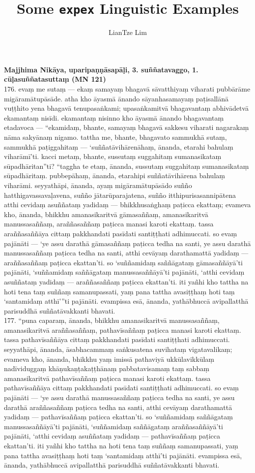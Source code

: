 \documentclass[11pt]{article}
\title{Some \texttt{expex} Linguistic Examples}
\author{LianTze Lim}
\begin{document}
\textbf{Majjhima Nikāya, uparipaṇṇāsapāḷi, 3. suññatavaggo, 1. cūḷasuññatasuttaṃ (MN 121)}\\[.3cm]

176. evaṃ me sutaṃ — ekaṃ samayaṃ bhagavā sāvatthiyaṃ viharati pubbārāme migāramātupāsāde. atha kho āyasmā ānando sāyanhasamayaṃ paṭisallānā vuṭṭhito yena bhagavā tenupasaṅkami; upasaṅkamitvā bhagavantaṃ abhivādetvā ekamantaṃ nisīdi. ekamantaṃ nisinno kho āyasmā ānando bhagavantaṃ etadavoca — “ekamidaṃ, bhante, samayaṃ bhagavā sakkesu viharati nagarakaṃ nāma sakyānaṃ nigamo. tattha me, bhante, bhagavato sammukhā sutaṃ, sammukhā paṭiggahitaṃ — ‘suññatāvihārenāhaṃ, ānanda, etarahi bahulaṃ viharāmī’ti. kacci metaṃ, bhante, sussutaṃ suggahitaṃ sumanasikataṃ sūpadhāritan”ti? “taggha te etaṃ, ānanda, sussutaṃ suggahitaṃ sumanasikataṃ sūpadhāritaṃ. pubbepāhaṃ, ānanda, etarahipi suññatāvihārena bahulaṃ viharāmi. seyyathāpi, ānanda, ayaṃ migāramātupāsādo suñño hatthigavassavaḷavena, suñño jātarūparajatena, suñño itthipurisasannipātena atthi cevidaṃ asuññataṃ yadidaṃ — bhikkhusaṅghaṃ paṭicca ekattaṃ; evameva kho, ānanda, bhikkhu amanasikaritvā gāmasaññaṃ, amanasikaritvā manussasaññaṃ, araññasaññaṃ paṭicca manasi karoti ekattaṃ. tassa araññasaññāya cittaṃ pakkhandati pasīdati santiṭṭhati adhimuccati. so evaṃ pajānāti — ‘ye assu darathā gāmasaññaṃ paṭicca tedha na santi, ye assu darathā manussasaññaṃ paṭicca tedha na santi, atthi cevāyaṃ darathamattā yadidaṃ — araññasaññaṃ paṭicca ekattan’ti. so ‘suññamidaṃ saññāgataṃ gāmasaññāyā’ti pajānāti, ‘suññamidaṃ saññāgataṃ manussasaññāyā’ti pajānāti, ‘atthi cevidaṃ asuññataṃ yadidaṃ — araññasaññaṃ paṭicca ekattan’ti. iti yañhi kho tattha na hoti tena taṃ suññaṃ samanupassati, yaṃ pana tattha avasiṭṭhaṃ hoti taṃ ‘santamidaṃ atthī’”ti pajānāti. evampissa esā, ānanda, yathābhuccā avipallatthā parisuddhā suññatāvakkanti bhavati.\\

177. “puna caparaṃ, ānanda, bhikkhu amanasikaritvā manussasaññaṃ, amanasikaritvā araññasaññaṃ, pathavīsaññaṃ paṭicca manasi karoti ekattaṃ. tassa pathavīsaññāya cittaṃ pakkhandati pasīdati santiṭṭhati adhimuccati. seyyathāpi, ānanda, āsabhacammaṃ saṅkusatena suvihataṃ vigatavalikaṃ; evameva kho, ānanda, bhikkhu yaṃ imissā pathaviyā ukkūlavikkūlaṃ nadīviduggaṃ khāṇukaṇṭakaṭṭhānaṃ pabbatavisamaṃ taṃ sabbaṃ amanasikaritvā pathavīsaññaṃ paṭicca manasi karoti ekattaṃ. tassa pathavīsaññāya cittaṃ pakkhandati pasīdati santiṭṭhati adhimuccati. so evaṃ pajānāti — ‘ye assu darathā manussasaññaṃ paṭicca tedha na santi, ye assu darathā araññasaññaṃ paṭicca tedha na santi, atthi cevāyaṃ darathamattā yadidaṃ — pathavīsaññaṃ paṭicca ekattan’ti. so ‘suññamidaṃ saññāgataṃ manussasaññāyā’ti pajānāti, ‘suññamidaṃ saññāgataṃ araññasaññāyā’ti pajānāti, ‘atthi cevidaṃ asuññataṃ yadidaṃ — pathavīsaññaṃ paṭicca ekattan’ti. iti yañhi kho tattha na hoti tena taṃ suññaṃ samanupassati, yaṃ pana tattha avasiṭṭhaṃ hoti taṃ ‘santamidaṃ atthī’ti pajānāti. evampissa esā, ānanda, yathābhuccā avipallatthā parisuddhā suññatāvakkanti bhavati.\\
\end{document}
